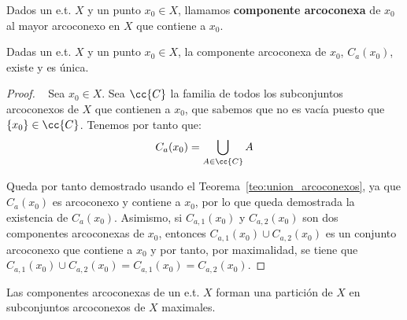 \begin{definicion}
    Dados un e.t. $X$ y un punto $x_0\in X$, llamamos \textbf{componente arcoconexa} de $x_0$ al mayor arcoconexo en $X$ que contiene a $x_0$.
\end{definicion}
\begin{prop}
    Dadas un e.t. $X$ y un punto $x_0\in X$, la componente arcoconexa de $x_0$, $C_a(x_0)$, existe y es única.
    \begin{proof}~
        Sea $x_0 \in X$. Sea $\cc{C}$ la familia de todos los subconjuntos arcoconexos de $X$ que contienen a $x_0$, que sabemos que no es vacía puesto que $\{x_0\}\in \cc{C}$. Tenemos por tanto que:
        \begin{gather*}
            C_a(x_0) = \bigcup\limits_{A\in \cc{C}} A
        \end{gather*}

        Queda por tanto demostrado usando el Teorema~\ref{teo:union_arcoconexos}, ya que $C_a(x_0)$ es arcoconexo y contiene a $x_0$, por lo que queda
        demostrada la existencia de $C_a(x_0)$. Asimismo, si $C_{a,1}(x_0)$ y $C_{a,2}(x_0)$ son dos componentes arcoconexas de $x_0$, entonces $C_{a,1}(x_0)\cup C_{a,2}(x_0)$ es un conjunto arcoconexo que contiene a $x_0$ y por tanto, por maximalidad, se tiene que $C_{a,1}(x_0)\cup C_{a,2}(x_0) = C_{a,1}(x_0) = C_{a,2}(x_0)$.
    \end{proof}
\end{prop}

\begin{teo}
    Las componentes arcoconexas de un e.t. $X$ forman una partición de $X$ en subconjuntos arcoconexos de $X$ maximales.
\end{teo}

